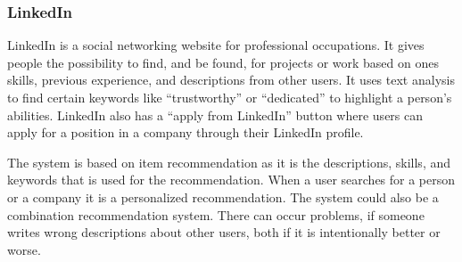 \subsubsection{LinkedIn}

LinkedIn is a social networking website for professional occupations. It gives people the possibility to find, and be found, for projects or work based on ones skills, previous experience, and descriptions from other users. It uses text analysis to find certain keywords like “trustworthy” or “dedicated” to highlight a person's abilities. LinkedIn also has a “apply from LinkedIn” button where users can apply for a position in a company through their LinkedIn profile. 

The system is based on item recommendation as it is the descriptions, skills, and keywords that is used for the recommendation. When a user searches for a person or a company it is a personalized recommendation. The system could also be a combination recommendation system. There can occur problems, if someone writes wrong descriptions about other users, both if it is intentionally better or worse.